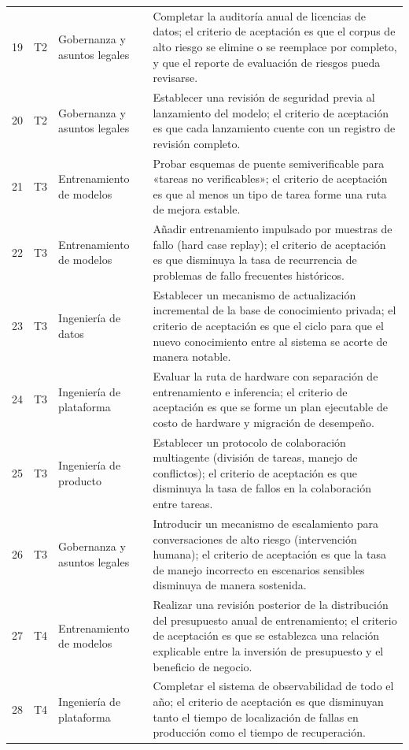 \documentclass[a4paper]{article}
\begin{document}
\begin{longtable}{p{}p{}p{}p{}}
19 & T2 & Gobernanza y asuntos legales & Completar la auditoría anual de licencias de datos; el criterio de aceptación es que el corpus de alto riesgo se elimine o se reemplace por completo, y que el reporte de evaluación de riesgos pueda revisarse. \\
20 & T2 & Gobernanza y asuntos legales & Establecer una revisión de seguridad previa al lanzamiento del modelo; el criterio de aceptación es que cada lanzamiento cuente con un registro de revisión completo. \\
21 & T3 & Entrenamiento de modelos & Probar esquemas de puente semiverificable para «tareas no verificables»; el criterio de aceptación es que al menos un tipo de tarea forme una ruta de mejora estable. \\
22 & T3 & Entrenamiento de modelos & Añadir entrenamiento impulsado por muestras de fallo (hard case replay); el criterio de aceptación es que disminuya la tasa de recurrencia de problemas de fallo frecuentes históricos. \\
23 & T3 & Ingeniería de datos & Establecer un mecanismo de actualización incremental de la base de conocimiento privada; el criterio de aceptación es que el ciclo para que el nuevo conocimiento entre al sistema se acorte de manera notable. \\
24 & T3 & Ingeniería de plataforma & Evaluar la ruta de hardware con separación de entrenamiento e inferencia; el criterio de aceptación es que se forme un plan ejecutable de costo de hardware y migración de desempeño. \\
25 & T3 & Ingeniería de producto & Establecer un protocolo de colaboración multiagente (división de tareas, manejo de conflictos); el criterio de aceptación es que disminuya la tasa de fallos en la colaboración entre tareas. \\
26 & T3 & Gobernanza y asuntos legales & Introducir un mecanismo de escalamiento para conversaciones de alto riesgo (intervención humana); el criterio de aceptación es que la tasa de manejo incorrecto en escenarios sensibles disminuya de manera sostenida. \\
27 & T4 & Entrenamiento de modelos & Realizar una revisión posterior de la distribución del presupuesto anual de entrenamiento; el criterio de aceptación es que se establezca una relación explicable entre la inversión de presupuesto y el beneficio de negocio. \\
28 & T4 & Ingeniería de plataforma & Completar el sistema de observabilidad de todo el año; el criterio de aceptación es que disminuyan tanto el tiempo de localización de fallas en producción como el tiempo de recuperación. \\

\end{longtable}
\end{document}
